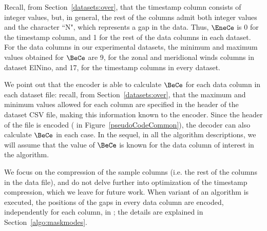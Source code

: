 Recall, from Section~\ref{datasets:over}, that the timestamp column consists of integer values, but, in general, the rest of the columns admit both integer values and the character ``N", which represents a gap in the data. Thus, $\EneCe$ is 0 for the timestamp column, and 1 for the rest of the data columns in each dataset. For the data columns in our experimental datasets, the minimum and maximum values obtained for $\BeCe$ are 9, for the zonal and meridional winds columns in dataset ElNino, and 17, for the timestamp columns in every dataset.

We point out that the encoder is able to calculate $\BeCe$ for each data column in each dataset file: recall, from Section~\ref{datasets:over}, that the maximum and minimum values allowed for each column are specified in the header of the dataset CSV file, making this information known to the encoder. Since the header of the file is encoded ( in Figure~\ref{pseudoCodeCommon}), the decoder can also calculate $\BeCe$ in each case. In the sequel, in all the algorithm descriptions, we will assume that the value of $\BeCe$ is known for the data column of interest in the algorithm.


\newcommand{\gapLine}{6}
We focus on the compression of the sample columns (i.e. the rest of the columns in the data file), and do not delve further into optimization of the timestamp compression, which we leave for future work. When variant \maskalgo of an algorithm is executed, the positions of the gaps in every data column are encoded, independently for each column, in \Line \gapLine; the details are explained in Section~\ref{algo:maskmodes}.

